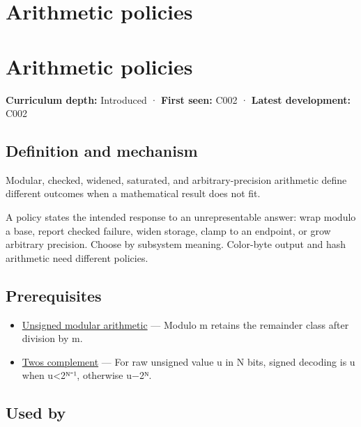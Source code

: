 \hypertarget{appendix-2ed044358b82}{}
\section*{Arithmetic policies}
\section{Arithmetic policies}\label{appendix-2ed044358b82-arithmetic-policies}

\textbf{Curriculum depth:} Introduced · \textbf{First seen:} C002 · \textbf{Latest development:} C002

\subsection{Definition and mechanism}\label{appendix-2ed044358b82-definition-and-mechanism}

Modular, checked, widened, saturated, and arbitrary-precision arithmetic define different outcomes when a mathematical result does not fit.

A policy states the intended response to an unrepresentable answer: wrap modulo a base, report checked failure, widen storage, clamp to an endpoint, or grow arbitrary precision. Choose by subsystem meaning. Color-byte output and hash arithmetic need different policies.

\subsection{Prerequisites}\label{appendix-2ed044358b82-prerequisites}

\begin{itemize}
\tightlist
\item
  \hyperref[appendix-c99977d88b33]{Unsigned modular arithmetic} --- Modulo m retains the remainder class after division by m.
\item
  \hyperref[appendix-4fbc03d20829]{Two\textquotesingle s complement} --- For raw unsigned value u in N bits, signed decoding is u when u\textless2ᴺ⁻¹, otherwise u−2ᴺ.
\end{itemize}

\subsection{Used by}\label{appendix-2ed044358b82-used-by}

